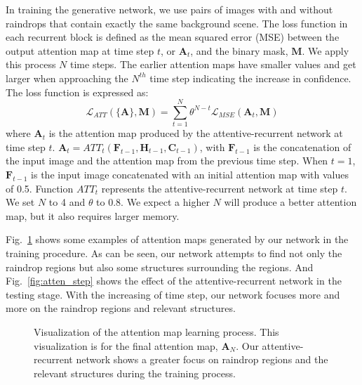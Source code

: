 \documentclass[10pt,twocolumn,letterpaper]{article}
\begin{document}
In training the generative network, we use pairs of images with and without raindrops that contain exactly the same background scene. The loss function in each recurrent block is defined as the mean squared error (MSE) between the output attention map at time step $t$, or  $\mathbf{A}_t$, and the binary mask, $\mathbf{M}$. We  apply this process $N$ time steps. The earlier attention maps have smaller values and get larger when approaching the $N^{th}$ time step indicating the increase in confidence. The loss function is expressed as:
\begin{equation}
\mathcal{L}_{ATT}(\{\mathbf{A}\}, \mathbf{M}) = \sum\limits^{N}_{t = 1} \theta^{N-t}\mathcal{L}_{MSE}(\mathbf{A}_t, \mathbf{M})
\end{equation}
where $\mathbf{A}_t$ is the attention map produced by the attentive-recurrent network at time step $t$. $\mathbf{A}_t = ATT_t(\mathbf{F}_{t-1}, \mathbf{H}_{t-1}, \mathbf{C}_{t-1})$, with $\mathbf{F}_{t-1}$  is  the concatenation of the input image and the attention map from the previous time step. When $t=1$, $\mathbf{F}_{t-1}$ is the input image concatenated with an initial attention map with values of 0.5.
 Function $ATT_t$ represents the attentive-recurrent network at time step $t$.
We set $N$ to 4 and $\theta$ to 0.8. We expect a higher $N$ will produce a better attention map, but it also requires larger memory. 

Fig.~\ref{fig:attention_map} shows some examples of attention maps generated by our network in the training procedure. As can be seen, our network attempts to find not only the raindrop regions but also some structures surrounding the regions. And Fig.~\ref{fig:atten_step} shows the effect of the attentive-recurrent network in the testing stage. With the increasing of time step, our network focuses more and more on the raindrop regions and relevant structures.


\begin{figure}
	\centering
	\caption{Visualization of the attention map learning process. This visualization is for the final attention map, $\mathbf{A}_N$. Our attentive-recurrent network shows a greater focus on raindrop regions and the relevant structures during the training process.}
	\label{fig:attention_map}
\end{figure}
\end{document}
